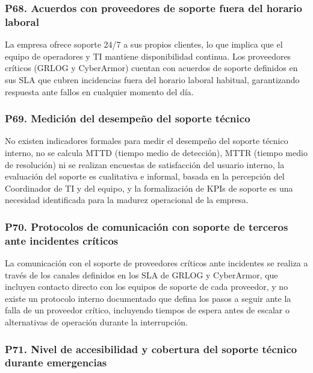 \documentclass[12pt]{article}
\begin{document}
\subsubsection*{\textbf{P68. Acuerdos con proveedores de soporte fuera del horario laboral}}

La empresa ofrece soporte 24/7 a sus propios clientes, lo que implica que el
equipo de operadores y TI mantiene disponibilidad continua. Los proveedores cr\'iticos
(GRLOG y CyberArmor) cuentan con acuerdos de soporte definidos en sus SLA que cubren
incidencias fuera del horario laboral habitual, garantizando respuesta ante fallos en
cualquier momento del d\'ia.

\subsubsection*{\textbf{P69. Medici\'on del desempe\~no del soporte t\'ecnico}}

No existen indicadores formales para medir el desempe\~no del soporte t\'ecnico
interno, no se calcula MTTD (tiempo medio de detecci\'on), MTTR (tiempo medio de
resoluci\'on) ni se realizan encuestas de satisfacci\'on del usuario interno, la evaluaci\'on
del soporte es cualitativa e informal, basada en la percepci\'on del Coordinador de TI
y del equipo, y la formalizaci\'on de KPIs de soporte es una necesidad identificada para
la madurez operacional de la empresa.

\subsubsection*{\textbf{P70. Protocolos de comunicaci\'on con soporte de terceros ante incidentes cr\'iticos}}

La comunicaci\'on con el soporte de proveedores cr\'iticos ante incidentes se realiza
a trav\'es de los canales definidos en los SLA de GRLOG y CyberArmor, que
incluyen contacto directo con los equipos de soporte de cada proveedor, y no existe un
protocolo interno documentado que defina los pasos a seguir ante la falla de un
proveedor cr\'itico, incluyendo tiempos de espera antes de escalar o alternativas
de operaci\'on durante la interrupci\'on.

\subsubsection*{\textbf{P71. Nivel de accesibilidad y cobertura del soporte t\'ecnico durante emergencias}}
\end{document}
